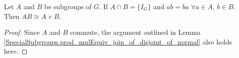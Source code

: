 \begin{lemma}
    \label{directproductZ}
    \leanok
Let $A$ and $B$ be subgroups of $G$. If $A \cap B = \{ I_G \}$ and $ab = ba$ $\forall a \in A$, $b \in B$. Then $AB \cong A \times B$.
\end{lemma}
\begin{proof}
    \leanok
    Since $A$ and $B$ commute, the argument outlined in Lemma \ref{SpecialSubgroups.prod_mulEquiv_join_of_disjoint_of_normal} also holds here.
\end{proof}

